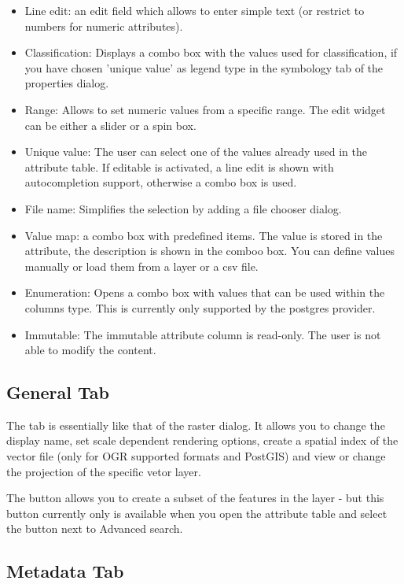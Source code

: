 \begin{itemize}
\item Line edit: an edit field which allows to enter simple text (or restrict
to
numbers for numeric attributes).
\item Classification: Displays a combo box with the values used for
classification, if you have chosen 'unique value' as legend type in the
symbology tab of the properties dialog.
\item Range: Allows to set numeric values from a specific range. The edit
widget can be either a slider or a spin box.
\item Unique value: The user can select one of the values already used in the
attribute table. If editable is activated, a line edit is shown with
autocompletion support, otherwise a combo box is used.
\item File name: Simplifies the selection by adding a file chooser dialog.
\item Value map: a combo box with predefined items. The value is stored in
the attribute, the description is shown in the comboo box. You can define
values manually or load them from a layer or a csv file.
\item Enumeration: Opens a combo box with values that can be used within the
columns type. This is currently only supported by the postgres provider.
\item Immutable: The immutable attribute column is read-only. The user is not
able to modify the content.
\end{itemize}

\subsection{General Tab}\label{vectorgeneraltab}

The  tab is essentially like that of the raster dialog. It
allows you to change the display name, set scale dependent rendering options,
create a spatial index of the vector file (only for OGR supported formats and
PostGIS) and view or change the projection of the specific vetor layer.

The  button allows you to create a subset of the
features in the layer - but this button currently only is available when you
open the attribute table and select the  button next to Advanced
search.

\subsection{Metadata Tab}

